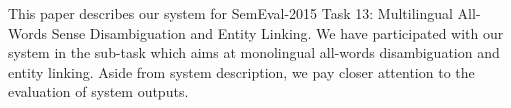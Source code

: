 This paper describes our system for SemEval-2015 Task 13: Multilingual All-Words Sense Disambiguation and Entity Linking. We have participated with our system in the sub-task which aims at monolingual all-words disambiguation and entity linking. Aside from system description, we pay closer attention to the evaluation of system outputs.
